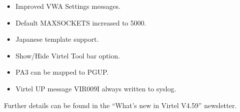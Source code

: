 \documentclass[letterpaper,10pt,english]{sphinxmanual}
\begin{document}
\begin{itemize}
\item {} 
Improved VWA Settings messages.

\item {} 
Default MAXSOCKETS increased to 5000.

\item {} 
Japanese template support.

\item {} 
Show/Hide Virtel Tool bar option.

\item {} 
PA3 can be mapped to PGUP.

\item {} 
Virtel UP message VIR009I always written to syslog.

\end{itemize}

Further details can be found in the “What’s new in Virtel V4.59” newsletter.



\renewcommand{\indexname}{Index}
\printindex
\end{document}
